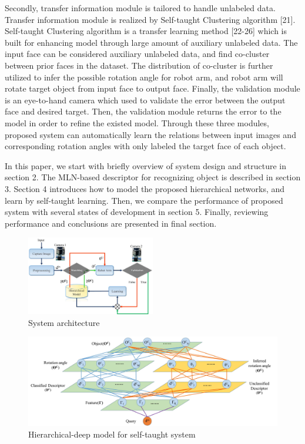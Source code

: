 \documentclass[journal]{IEEEtran}
\begin{document}
Secondly, transfer information module is tailored to handle unlabeled data. Transfer information module is realized by Self-taught Clustering algorithm [21]. Self-taught Clustering algorithm is a transfer learning method [22-26] which is built for enhancing model through large amount of auxiliary unlabeled data. The input face can be considered auxiliary unlabeled data, and find co-cluster between prior faces in the dataset. The distribution of co-cluster is further utilized to infer the possible rotation angle for robot arm, and robot arm will rotate target object from input face to output face. Finally, the validation module is an eye-to-hand camera which used to validate the error between the output face and desired target. Then, the validation module returns the error to the model in order to refine the existed model. Through these three modules, proposed system can automatically learn the relations between input images and corresponding rotation angles with only labeled the target face of each object.

In this paper, we start with briefly overview of system design and structure in section 2. The MLN-based descriptor for recognizing object is described in section 3. Section 4 introduces how to model the proposed hierarchical networks, and learn by self-taught learning. Then, we compare the performance of proposed system with several states of development in section 5. Finally, reviewing performance and conclusions are presented in final section.


\begin{figure}[!t]
\begin{center}
\includegraphics[width=0.5\textwidth]{j_img/fig1.jpg}
\caption{System architecture}\label{test}
\end{center}
\end{figure}

\begin{figure}[!t]
\begin{center}
\includegraphics*[width=7 in]{j_img/fig3.jpg}
\caption{Hierarchical-deep model for self-taught system}\label{test}
\end{center}
\end{figure}
\end{document}
